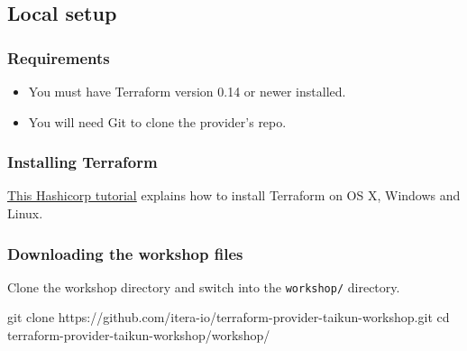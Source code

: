 \subsection{Local setup}\label{sec:local}

\subsubsection{Requirements}
\begin{itemize}
  \item You must have Terraform version 0.14 or newer installed.
  \item You will need Git to clone the provider's repo.
\end{itemize}

\subsubsection{Installing Terraform}
\href{https://learn.hashicorp.com/tutorials/terraform/install-cli#install-terraform}{This Hashicorp tutorial}
explains how to install Terraform on OS X, Windows and Linux.

\subsubsection{Downloading the workshop files}
Clone the workshop directory and switch into the \texttt{workshop/} directory.
\begin{shell}
git clone https://github.com/itera-io/terraform-provider-taikun-workshop.git
cd terraform-provider-taikun-workshop/workshop/
\end{shell}
